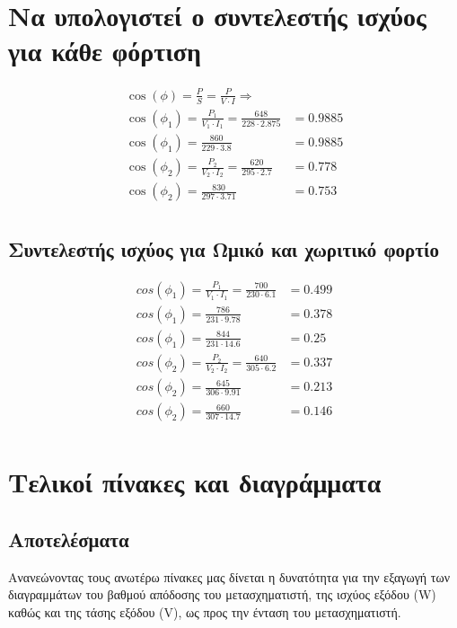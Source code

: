 \documentclass[11pt]{article}
\newcommand{\en}[1]{\foreignlanguage{english}{#1}}
\begin{document}
\section{Να υπολογιστεί ο συντελεστής ισχύος για κάθε φόρτιση}
\label{sec:orgb72dfb9}
\begin{equation}
\begin{align}
\cos(\phi)=\frac{P}{S} = \frac{P}{V \cdot I} \Rightarrow \\
\cos(\phi_{1})=\frac{P_{1}}{V_{1} \cdot I_{1}} = \frac{648}{228 \cdot 2.875} &= 0.9885 \\
\cos(\phi_{1})= \frac{860}{229 \cdot 3.8} &= 0.9885 \\
\cos(\phi_{2})=\frac{P_{2}}{V_{2} \cdot I_{2}} = \frac{620}{295 \cdot 2.7} &= 0.778 \\
\cos(\phi_{2})= \frac{830}{297 \cdot 3.71} &= 0.753 \\
\end{align}
\end{equation}

\subsection{Συντελεστής ισχύος για Ωμικό και χωριτικό φορτίο}
\label{sec:org987feeb}
\begin{equation}
\begin{align}
cos(\phi_{1})=\frac{P_{1}}{V_{1} \cdot I_{1}} = \frac{700}{230 \cdot 6.1} &= 0.499 \\
cos(\phi_{1})= \frac{786}{231 \cdot 9.78} &= 0.378 \\
cos(\phi_{1})= \frac{844}{231 \cdot 14.6} &= 0.25 \\
cos(\phi_{2})=\frac{P_{2}}{V_{2} \cdot I_{2}} = \frac{640}{305 \cdot 6.2} &= 0.337 \\
cos(\phi_{2})= \frac{645}{306 \cdot 9.91} &= 0.213 \\
cos(\phi_{2})= \frac{660}{307 \cdot 14.7} &= 0.146 \\
\end{align}
\end{equation}
\section{Τελικοί πίνακες και διαγράμματα}
\label{sec:org176f767}
\subsection{Αποτελέσματα}
\label{sec:org482377c}
Ανανεώνοντας τους ανωτέρω πίνακες μας δίνεται η δυνατότητα για την εξαγωγή των διαγραμμάτων του βαθμού απόδοσης του μετασχηματιστή, της ισχύος εξόδου (\en{W}) καθώς και της τάσης εξόδου (\en{V}), ως προς την ένταση του μετασχηματιστή.
\end{document}
